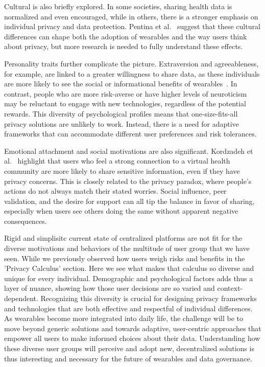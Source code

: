 	Cultural is also briefly explored. In some societies, sharing health data is normalized and even encouraged, while in others, there is a stronger emphasis on individual privacy and data protection. Pentina et al.~\cite{Pentina2016} suggest that these cultural differences can shape both the adoption of wearables and the way users think about privacy, but more research is needed to fully understand these effects.

	Personality traits further complicate the picture. Extraversion and agreeableness, for example, are linked to a greater willingness to share data, as these individuals are more likely to see the social or informational benefits of wearables~\cite{Pentina2016}. In contrast, people who are more risk-averse or have higher levels of neuroticism may be reluctant to engage with new technologies, regardless of the potential rewards. This diversity of psychological profiles means that one-size-fits-all privacy solutions are unlikely to work. Instead, there is a need for adaptive frameworks that can accommodate different user preferences and risk tolerances.

	Emotional attachment and social motivations are also significant. Kordzadeh et al.~\cite{Kordzadeh2016} highlight that users who feel a strong connection to a virtual health community are more likely to share sensitive information, even if they have privacy concerns. This is closely related to the privacy paradox, where people’s actions do not always match their stated worries. Social influence, peer validation, and the desire for support can all tip the balance in favor of sharing, especially when users see others doing the same without apparent negative consequences.

	Rigid and simplisitc current state of centralized platforms are not fit for the diverse motivations and behaviors of the multitude of user group that we have seen. While we previously observed how users weigh risks and benefits in the 'Privacy Calculus' section. Here we see what makes that calculus so diverse and unique for every individual. Demographic and psychological factors adds thus a layer of nuance, showing how those user decisions are so varied and context-dependent. Recognizing this diversity is crucial for designing privacy frameworks and technologies that are both effective and respectful of individual differences. As wearables become more integrated into daily life, the challenge will be to move beyond generic solutions and towards adaptive, user-centric approaches that empower all users to make informed choices about their data. Understanding how these diverse user groups will perceive and adopt new, decentralized solutions is thus interesting and necessary for the future of wearables and data governance.
